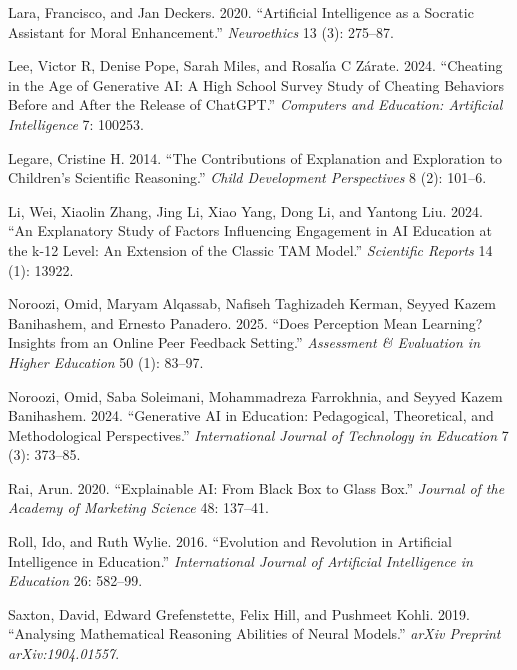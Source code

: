\documentclass[
  12pt,
]{article}
\newlength{\cslhangindent}
\newenvironment{CSLReferences}[2] %
 {\begin{list}{}{%
  \setlength{\itemindent}{0pt}
  \setlength{\leftmargin}{0pt}
  \setlength{\parsep}{0pt}
  \ifodd #1
   \setlength{\leftmargin}{\cslhangindent}
   \setlength{\itemindent}{-1\cslhangindent}
  \fi
  \setlength{\itemsep}{#2\baselineskip}}}
 {\end{list}}
\begin{document}
\begin{CSLReferences}{1}{0}
Lara, Francisco, and Jan Deckers. 2020. {``Artificial Intelligence as a Socratic Assistant for Moral Enhancement.''} \emph{Neuroethics} 13 (3): 275--87.

Lee, Victor R, Denise Pope, Sarah Miles, and Rosalı́a C Zárate. 2024. {``Cheating in the Age of Generative AI: A High School Survey Study of Cheating Behaviors Before and After the Release of ChatGPT.''} \emph{Computers and Education: Artificial Intelligence} 7: 100253.

Legare, Cristine H. 2014. {``The Contributions of Explanation and Exploration to Children's Scientific Reasoning.''} \emph{Child Development Perspectives} 8 (2): 101--6.

Li, Wei, Xiaolin Zhang, Jing Li, Xiao Yang, Dong Li, and Yantong Liu. 2024. {``An Explanatory Study of Factors Influencing Engagement in AI Education at the k-12 Level: An Extension of the Classic TAM Model.''} \emph{Scientific Reports} 14 (1): 13922.

Noroozi, Omid, Maryam Alqassab, Nafiseh Taghizadeh Kerman, Seyyed Kazem Banihashem, and Ernesto Panadero. 2025. {``Does Perception Mean Learning? Insights from an Online Peer Feedback Setting.''} \emph{Assessment \& Evaluation in Higher Education} 50 (1): 83--97.

Noroozi, Omid, Saba Soleimani, Mohammadreza Farrokhnia, and Seyyed Kazem Banihashem. 2024. {``Generative AI in Education: Pedagogical, Theoretical, and Methodological Perspectives.''} \emph{International Journal of Technology in Education} 7 (3): 373--85.

Rai, Arun. 2020. {``Explainable AI: From Black Box to Glass Box.''} \emph{Journal of the Academy of Marketing Science} 48: 137--41.

Roll, Ido, and Ruth Wylie. 2016. {``Evolution and Revolution in Artificial Intelligence in Education.''} \emph{International Journal of Artificial Intelligence in Education} 26: 582--99.

Saxton, David, Edward Grefenstette, Felix Hill, and Pushmeet Kohli. 2019. {``Analysing Mathematical Reasoning Abilities of Neural Models.''} \emph{arXiv Preprint arXiv:1904.01557}.


\end{CSLReferences}
\end{document}
